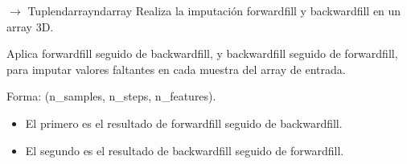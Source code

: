 \documentclass[letterpaper,10pt,english]{sphinxmanual}
\begin{document}
\begin{fulllineitems}
\label{\detokenize{pampaneira_imputation:pampaneira_imputation.imputation_methods.impute_forward_backward}}
\pysigstartsignatures
\pysiglinewithargsret
{}
{}
{{ $\rightarrow$ Tuple\DUrole{p}{{[}}ndarrayndarray\DUrole{p}{{]}}}}
\pysigstopsignatures
\sphinxAtStartPar
Realiza la imputación forward\sphinxhyphen{}fill y backward\sphinxhyphen{}fill en un array 3D.

\sphinxAtStartPar
Aplica forward\sphinxhyphen{}fill seguido de backward\sphinxhyphen{}fill, y backward\sphinxhyphen{}fill seguido de forward\sphinxhyphen{}fill,
para imputar valores faltantes en cada muestra del array de entrada.
\begin{description}
\begin{description}
\sphinxAtStartPar
Forma: (n\_samples, n\_steps, n\_features).

\end{description}

\begin{description}
\begin{itemize}
\item {} 
\sphinxAtStartPar
El primero es el resultado de forward\sphinxhyphen{}fill seguido de backward\sphinxhyphen{}fill.

\item {} 
\sphinxAtStartPar
El segundo es el resultado de backward\sphinxhyphen{}fill seguido de forward\sphinxhyphen{}fill.

\end{itemize}

\end{description}

\end{description}

\end{fulllineitems}

\end{document}
